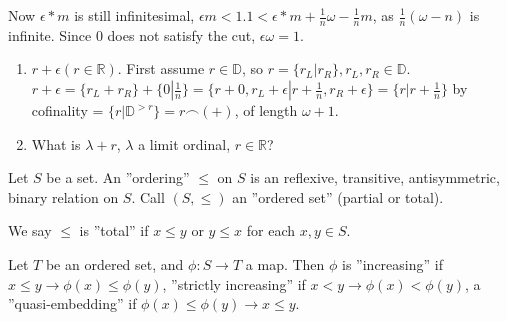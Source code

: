 Now $\epsilon *m$ is still infinitesimal, $\epsilon m <1.   1< \epsilon *m+\frac{1}{n}\omega - \frac{1}{n}m$, as $\frac{1}{n}(\omega -n)$ is infinite. Since $0$ does not satisfy the cut, $\epsilon \omega =1$.
\begin{enumerate}
  \item $r + \epsilon (r \in \mathbb{R})$. First assume $r \in \mathbb{D}$, so $r=\{r_L|r_R\}, r_L, r_R \in \mathbb{D}$. $r + \epsilon = \{r_L + r_R\} + \{0|\frac{1}{n}\}=\{r+0, r_L + \epsilon|r+\frac{1}{n}, r_R + \epsilon\}= \{r|r+\frac{1}{n}\}$ by cofinality = $\{r|\mathbb{D}^{>r}\}=r\frown(+)$, of length $\omega +1$.
  \item What is $\lambda +r$, $\lambda$ a limit ordinal, $r \in \mathbb{R}$?
\end{enumerate}
Let $S$ be a set. An ''ordering'' $\leq$ on $S$ is an reflexive, transitive, antisymmetric, binary relation on $S$. Call $(S,\leq)$ an ''ordered set'' (partial or total).

We say $\leq$ is ''total'' if $x \leq y$ or $y \leq x$ for each $x, y \in S$.

Let $T$ be an ordered set, and $\phi: S \rightarrow T$ a map. Then $\phi$ is ''increasing'' if $x \leq y \rightarrow \phi(x) \leq \phi(y)$, ''strictly increasing'' if $x < y \rightarrow \phi(x) < \phi(y)$, a ''quasi-embedding'' if $\phi(x) \leq \phi(y) \rightarrow x \leq y$.

